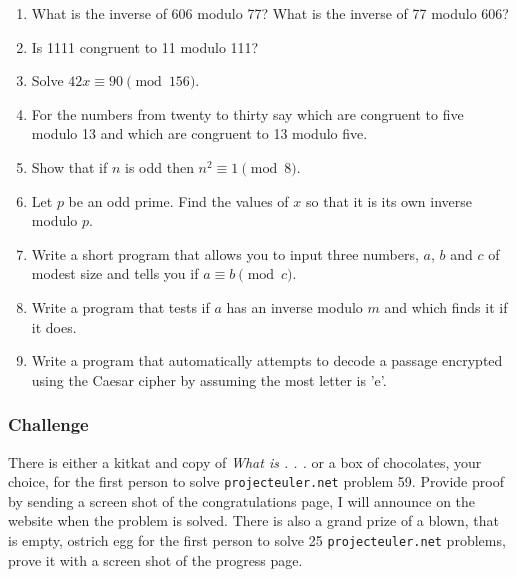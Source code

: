 \documentclass[12pt]{article}
\begin{document}
\begin{enumerate}

\item What is the inverse of 606 modulo 77? What is the inverse of 77 modulo 606?

\item Is 1111 congruent to 11 modulo 111?

\item Solve $42x\equiv 90 \pmod {156}$.

\item For the numbers from twenty to thirty say which are congruent to
  five modulo 13 and which are congruent to 13 modulo five.

\item Show that if $n$ is odd then $n^2\equiv 1\pmod 8$.

\item Let $p$ be an odd prime. Find the values of $x$ so that it is
  its own inverse modulo $p$.

\item Write a short program that allows you to input three numbers,
  $a$, $b$ and $c$ of modest size and tells you if $a\equiv b \pmod
  c$.

\item Write a program that tests if $a$ has an inverse modulo $m$ and
  which finds it if it does.

\item Write a program that automatically attempts to decode a passage
  encrypted using the Caesar cipher by assuming the most letter is 'e'.

\end{enumerate}


\subsubsection*{Challenge}
There is either a kitkat and copy of \emph{What is . . .} or a box of
chocolates, your choice, for the first person to solve
\texttt{projecteuler.net} problem 59. Provide proof by sending a
screen shot of the congratulations page, I will announce on the
website when the problem is solved. There is also a grand prize of a
blown, that is empty, ostrich egg for the first person to solve 25
\texttt{projecteuler.net} problems, prove it with a screen shot of the
progress page.
\end{document}

